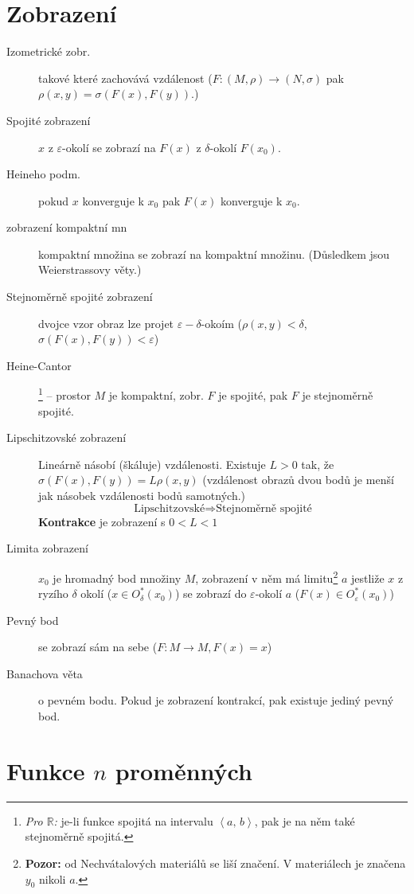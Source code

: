 \documentclass[a4paper, twoside,%
12pt]{article}
\newcommand{\R}{\mathbb{R}}
\begin{document}
\section{Zobrazení}
\begin{description}
    \item[Izometrické zobr.] takové které zachovává vzdálenost ($F: (M, \rho)\rightarrow(N, \sigma)$ pak  $\rho(x,y)=\sigma(F(x), F(y))$.)
    \item[Spojité zobrazení] $x$ z $\varepsilon$-okolí se zobrazí na $F(x)$ z $\delta$-okolí $F(x_0)$.
    \item[Heineho podm.] pokud $x$ konverguje k $x_0$ pak $F(x)$ konverguje k $x_0$.
    \item[zobrazení kompaktní mn] kompaktní množina se zobrazí na kompaktní množinu. (Důsledkem jsou Weierstrassovy věty.)
    \item[Stejnoměrně spojité zobrazení] dvojce vzor obraz lze projet $\varepsilon-\delta$-okoím ($\rho(x,y)<\delta$, $\sigma(F(x),F(y))<\varepsilon$)
    \item[Heine-Cantor]\footnote{\emph{Pro $\R$:} je-li funkce spojitá na intervalu $\left< a,\,b\right>$, pak je na něm také stejnoměrně spojitá.} -- prostor $M$ je kompaktní, zobr. $F$ je spojité, pak $F$ je stejnoměrně spojité.
    \item[Lipschitzovské zobrazení] Lineárně násobí (škáluje) vzdálenosti. Existuje $L>0$ tak, že $\sigma(F(x),F(y)) = L \rho(x,y)$ (vzdálenost obrazů dvou bodů je menší jak násobek vzdálenosti bodů samotných.)
    $$\text{Lipschitzovské} \Rightarrow \text{Stejnoměrně spojité}$$
    \textbf{Kontrakce} je zobrazení s $0<L<1$ 
    \item[Limita zobrazení] $x_0$ je hromadný bod množiny $M$, zobrazení v něm má limitu\footnote{\textbf{Pozor:} od Nechvátalových materiálů se liší značení. V materiálech je značena $y_0$ nikoli $a$. } $a$ jestliže $x$ z ryzího $\delta$ okolí ($x \in O_\delta^* (x_0)$) se zobrazí do $\varepsilon$-okolí $a$ ($F(x)\in O_\varepsilon ^* (x_0)$)
    \item[Pevný bod] se zobrazí sám na sebe ($F: M\rightarrow M, F(x)=x$) 
    \item[Banachova věta] o pevném bodu. Pokud je zobrazení kontrakcí, pak existuje jediný pevný bod.
\end{description}

\section{Funkce $n$ proměnných}
\end{document}

